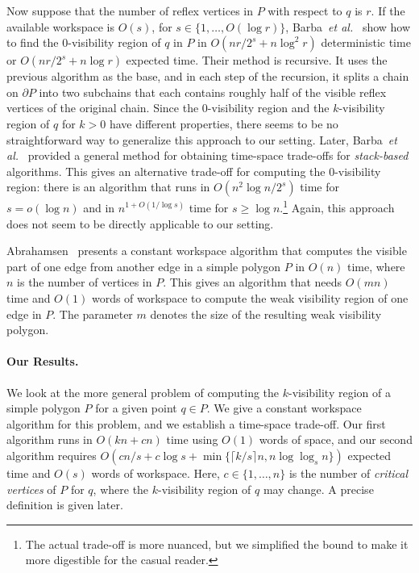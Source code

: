 \documentclass[11pt, a4paper]{article}
\newcommand{\etal}{\emph{et al.}\xspace}
\begin{document}
Now suppose that the number of reflex vertices in
$P$ with respect to $q$ is $r$. If the 
available workspace is $O(s)$, for 
$s \in \{1, \dots, O(\log r)\}$, Barba~\etal~\cite{barba2014computing} 
show how to find the $0$-visibility region 
of $q$ in $P$ in $O({nr}/{2^s}+n\log^2{r})$ 
deterministic time or $O({nr}/{2^s}+n\log{r})$ 
expected time. Their method is recursive. 
It uses the previous algorithm as the base,
and in each step of the recursion, it splits a 
chain on $\partial P$ into two subchains that each 
contains roughly half of the visible reflex vertices 
of the original chain. Since the $0$-visibility region 
and the $k$-visibility region of $q$ for $k > 0$ have 
different properties, there seems to be no 
straightforward way to generalize this approach
to our setting.
Later, Barba~\etal~\cite{barba2015space} provided
a general method for obtaining time-space trade-offs for
\emph{stack-based} algorithms. 
This gives an alternative trade-off for 
computing the $0$-visibility region:
there is an algorithm that 
runs in $O(n^2\log n/2^s)$ 
time for $s = o(\log n)$ and 
in $n^{1+O(1/\log s)}$ time for $s \geq \log n$.\footnote{The 
actual trade-off is more nuanced, 
but we simplified the bound to make it more digestible for the
casual reader.}
Again,
this approach does not seem to be directly applicable
to our setting.

Abrahamsen~\cite{Abrahamsen13} presents a constant workspace
algorithm that computes the visible part of one edge
from another edge in a simple polygon $P$ in $O(n)$ time,
where $n$ is the number of vertices in $P$.
This gives an algorithm that needs $O(mn)$ 
time and $O(1)$ words of workspace to compute
the weak visibility region of one edge in $P$.
The parameter $m$ denotes the size of the resulting
weak visibility polygon.

\paragraph{Our Results.}
We look at the more general problem of 
computing the $k$-visibility region of a simple 
polygon $P$ for a given point $q\in P$.
We give a constant workspace algorithm for this
problem, and we establish a time-space trade-off. 
Our first algorithm runs in $O(kn + cn)$ time
using $O(1)$ words of space, and our second 
algorithm requires $O(cn/s+c\log{s} + 
\min\{\lceil k/s \rceil n,n \log{\log_s{n}}\})$ 
expected time and $O(s)$ words of workspace. 
Here, $c \in \{1, \dots, n\}$ is the number of 
\emph{critical vertices} of $P$ for $q$, where the 
$k$-visibility region of $q$ may change. A precise
definition is given later. 
\end{document}
